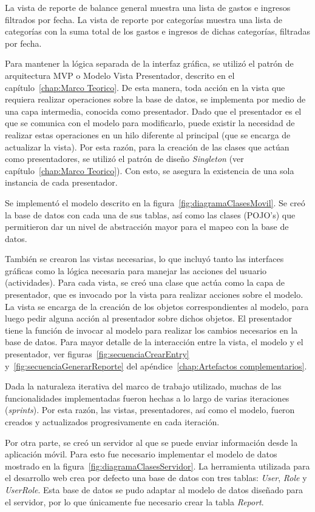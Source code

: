 La vista de reporte de balance general muestra una lista de gastos e ingresos filtrados por fecha. La vista de reporte por categorías muestra una lista de categorías con la suma total de los gastos e ingresos de dichas categorías, filtradas por fecha.

Para mantener la lógica separada de la interfaz gráfica, se utilizó el patrón de arquitectura MVP o Modelo Vista Presentador, descrito en el capítulo~\ref{chap:Marco Teorico}. De esta manera, toda acción en la vista que requiera realizar operaciones sobre la base de datos, se implementa por medio de una capa intermedia, conocida como presentador. Dado que el presentador es el que se comunica con el modelo para modificarlo, puede existir la necesidad de realizar estas operaciones en un hilo diferente al principal (que se encarga de actualizar la vista). Por esta razón, para la creación de las clases que actúan como presentadores, se utilizó el patrón de diseño \textit{Singleton} (ver capítulo~\ref{chap:Marco Teorico}). Con esto, se asegura la existencia de una sola instancia de cada presentador. 

Se implementó el modelo descrito en la figura~\ref{fig:diagramaClasesMovil}. Se creó la base de datos con cada una de sus tablas, así como las clases (POJO's) que permitieron dar un nivel de abstracción mayor para el mapeo con la base de datos.

También se crearon las vistas necesarias, lo que incluyó tanto las interfaces gráficas como la lógica necesaria para manejar las acciones del usuario (actividades). Para cada vista, se creó una clase que actúa como la capa de presentador, que es invocado por la vista para realizar acciones sobre el modelo. La vista se encarga de la creación de los objetos correspondientes al modelo, para luego pedir alguna acción al presentador sobre dichos objetos. El presentador tiene la función de invocar al modelo para realizar los cambios necesarios en la base de datos. Para mayor detalle de la interacción entre la vista, el modelo y el presentador, ver figuras~\ref{fig:secuenciaCrearEntry} y~\ref{fig:secuenciaGenerarReporte} del apéndice~\ref{chap:Artefactos complementarios}.

Dada la naturaleza iterativa del marco de trabajo utilizado, muchas de las funcionalidades implementadas fueron hechas a lo largo de varias iteraciones (\textit{sprints}). Por esta razón, las vistas, presentadores, así como el modelo, fueron creados y actualizados progresivamente en cada iteración.

Por otra parte, se creó un servidor al que se puede enviar información desde la aplicación móvil. 
Para esto fue necesario implementar el modelo de datos mostrado en la figura~\ref{fig:diagramaClasesServidor}. La herramienta utilizada para el desarrollo web crea por defecto una base de datos con tres tablas: \textit{User}, \textit{Role} y \textit{UserRole}. Esta base de datos se pudo adaptar al modelo de datos diseñado para el servidor, por lo que únicamente fue necesario crear la tabla \textit{Report}.

